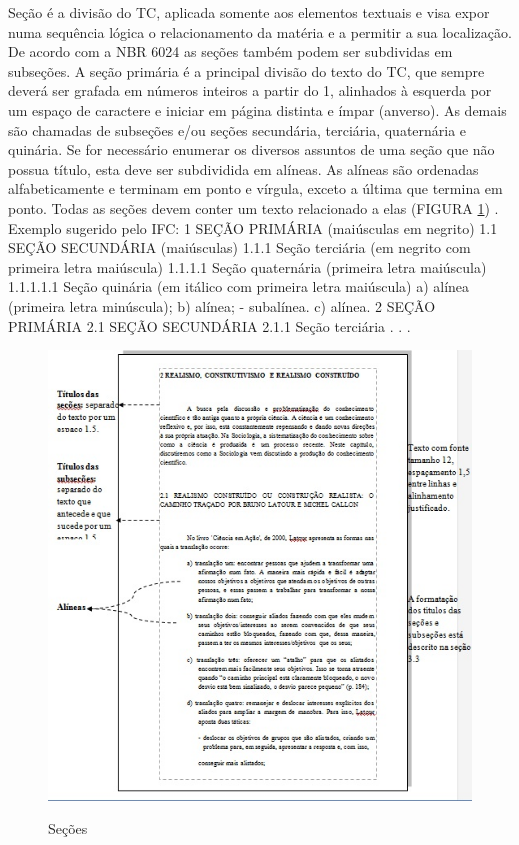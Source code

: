 Seção é a divisão do TC, aplicada somente aos elementos textuais e visa expor numa sequência lógica o relacionamento da matéria e a permitir a sua localização. De acordo com a NBR 6024 as seções também podem ser subdividas em subseções.
A seção primária é a principal divisão do texto do TC, que sempre deverá ser grafada em números inteiros a partir do 1, alinhados à esquerda por um espaço de caractere e iniciar em página distinta e ímpar (anverso). As demais são chamadas de subseções e/ou seções secundária, terciária, quaternária e quinária. Se for necessário enumerar os diversos assuntos de uma seção que não possua título, esta deve ser subdividida em alíneas. As alíneas são ordenadas alfabeticamente e terminam em ponto e vírgula, exceto a última que termina em ponto. Todas as seções devem conter um texto relacionado a elas (FIGURA \ref{fig:secoes}) .
Exemplo sugerido pelo IFC:
1 SEÇÃO PRIMÁRIA (maiúsculas em negrito)
1.1 SEÇÃO SECUNDÁRIA (maiúsculas)
1.1.1 Seção terciária (em negrito com primeira letra maiúscula)
1.1.1.1 Seção quaternária (primeira letra maiúscula)
1.1.1.1.1 Seção quinária (em itálico com primeira letra maiúscula)
a) alínea (primeira letra minúscula);
b) alínea;
    - subalínea.
c) alínea.
2 SEÇÃO PRIMÁRIA 
2.1 SEÇÃO SECUNDÁRIA 
2.1.1 Seção terciária 
.
.
.
\begin{figure}[htb]
	\caption{Seções}
    \centering
    {\parbox{16cm}{
		\includegraphics[scale=1.1]{images/Fig2.jpg}
	    \label{fig:secoes}
	    \hspace{0.0cm}{Fonte: Elaboração das Autoras, 2014}
    }}
\end{figure}


